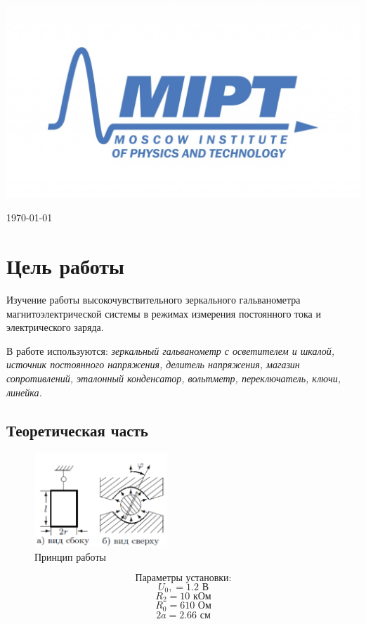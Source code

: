 \documentclass[a4paper, 12pt]{article}
\newenvironment{bottompar}{\par\vspace*{\fill}}{\clearpage}
\begin{document}
\begin{titlepage}
\begin{bottompar}
	\begin{center}
		\includegraphics[width = 80 mm]{logo.jpg}
	\end{center}
	{\large \today}

\end{bottompar}
\vfill %

\end{titlepage}

\section{Цель работы}
Изучение работы высокочувствительного зеркального гальванометра магнитоэлектрической системы в режимах измерения постоянного тока и электрического заряда.

В работе используются: \textit{зеркальный гальванометр с осветителем и шкалой, источник постоянного напряжения, делитель напряжения, магазин сопротивлений, эталонный конденсатор, вольтметр, переключатель, ключи, линейка.}


\subsection*{Теоретическая часть}

\begin{figure}
\includegraphics[width=5cm]{t}
\caption{Принцип работы}
\end{figure} 

		$$\text{Параметры установки:}$$
$$U_0,  = 1.2 \text{ В}$$
$$R_2 = 10 \text{ кОм}$$
$$R_0 = 610 \text{ Ом}$$
$$2a = 2.66 \text{ см}$$
\vspace{1 cm}
\end{document}
